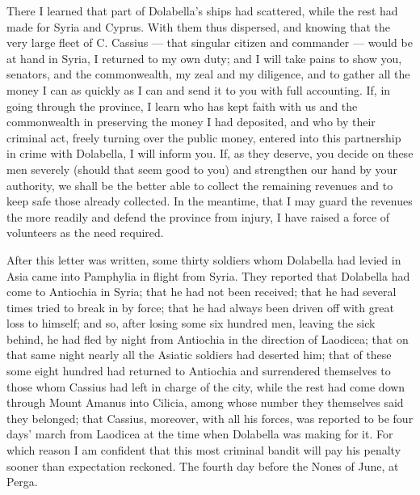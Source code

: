  There I learned that part of Dolabella's ships had scattered, while the rest had made for Syria and Cyprus. With them thus dispersed, and knowing that the very large fleet of C. Cassius --- that singular citizen and commander --- would be at hand in Syria, I returned to my own duty; and I will take pains to show you, senators, and the commonwealth, my zeal and my diligence, and to gather all the money I can as quickly as I can and send it to you with full accounting. If, in going through the province, I learn who has kept faith with us and the commonwealth in preserving the money I had deposited, and who by their criminal act, freely turning over the public money, entered into this partnership in crime with Dolabella, I will inform you. If, as they deserve, you decide on these men severely (should that seem good to you) and strengthen our hand by your authority, we shall be the better able to collect the remaining revenues and to keep safe those already collected. In the meantime, that I may guard the revenues the more readily and defend the province from injury, I have raised a force of volunteers as the need required.

 After this letter was written, some thirty soldiers whom Dolabella had levied in Asia came into Pamphylia in flight from Syria. They reported that Dolabella had come to Antiochia in Syria; that he had not been received; that he had several times tried to break in by force; that he had always been driven off with great loss to himself; and so, after losing some six hundred men, leaving the sick behind, he had fled by night from Antiochia in the direction of Laodicea; that on that same night nearly all the Asiatic soldiers had deserted him; that of these some eight hundred had returned to Antiochia and surrendered themselves to those whom Cassius had left in charge of the city, while the rest had come down through Mount Amanus into Cilicia, among whose number they themselves said they belonged; that Cassius, moreover, with all his forces, was reported to be four days' march from Laodicea at the time when Dolabella was making for it. For which reason I am confident that this most criminal bandit will pay his penalty sooner than expectation reckoned. The fourth day before the Nones of June, at Perga.
